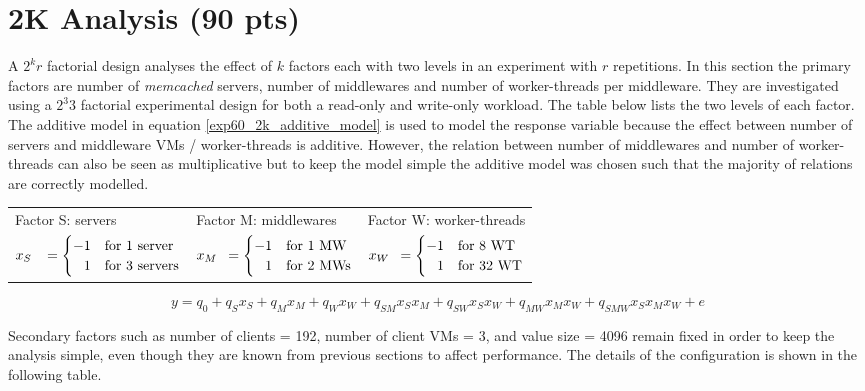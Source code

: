 \documentclass[report.tex]{subfiles}
\begin{document}
\section{2K Analysis (90 pts)}


A $2^{k}r$ factorial design analyses the effect of $k$ factors each with two levels in an experiment with $r$ repetitions. In this section the primary factors are number of \emph{memcached} servers, number of middlewares and number of worker-threads per middleware.
They are investigated using a $2^{3}3$ factorial experimental design for both a read-only and write-only workload. The table below lists the two levels of each factor.
The additive model in equation \ref{exp60_2k_additive_model} is used to model the response variable because the effect between number of servers and middleware VMs / worker-threads is additive. However, the relation between number of middlewares and  number of worker-threads can also be seen as multiplicative but to keep the model simple the additive model was chosen such that the majority of relations are correctly modelled.


\begin{center}
	\begin{tabular}{l|l|l}
		Factor S: servers & Factor M:  middlewares & Factor W: worker-threads\Tstrut \\
		$x_{S\hphantom{M}} = \begin{cases}-1 & \text{for 1 server}\\ \hphantom{-}1 & \text{for 3 servers}\end{cases}$ &
		$x_{M\hphantom{S}} = \begin{cases}-1 & \text{for 1 MW}\\ \hphantom{-}1 & \text{for 2 MWs}\end{cases}$ & 
		$x_{W\hphantom{S}} = \begin{cases}-1 & \text{for 8 WT}\\ \hphantom{-}1 & \text{for 32 WT}\end{cases}$\Bstrut\\
	\end{tabular} 
\end{center}

\begin{equation}
y=q_0 + q_Sx_S + q_Mx_M + q_Wx_W + q_{SM}x_Sx_M + q_{SW}x_Sx_W + q_{MW}x_Mx_W + q_{SMW}x_Sx_Mx_W + e
\label{exp60_2k_additive_model}
\end{equation}

Secondary factors such as number of clients = 192, number of client VMs = 3, and value size = 4096 remain fixed in order to keep the analysis simple, even though they are known from previous sections to affect performance.
The details of the configuration is shown in the following table.
\end{document}
